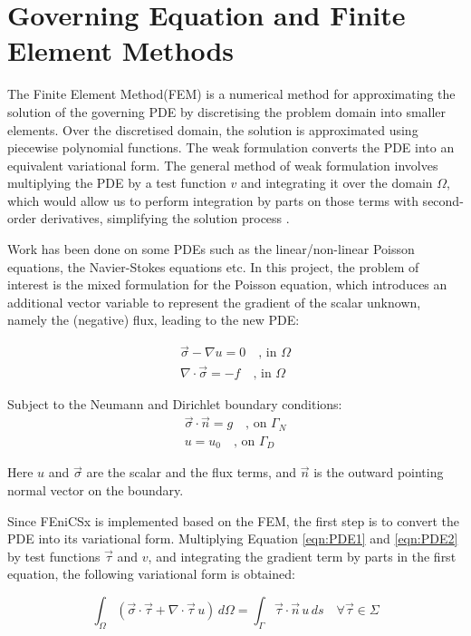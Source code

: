 \section{Governing Equation and Finite Element Methods}
The Finite Element Method(FEM) is a numerical method for approximating the solution of the governing PDE by discretising the problem domain into smaller elements. Over the discretised domain, the solution is approximated using piecewise polynomial functions. The weak formulation converts the PDE into an equivalent variational form. The general method of weak formulation involves multiplying the PDE by a test function $v$ and integrating it over the domain $\Omega$, which would allow us to perform integration by parts on those terms with second-order derivatives, simplifying the solution process \cite{dolfinxtutorial2023}. 

Work has been done on some PDEs such as the linear/non-linear Poisson equations, the Navier-Stokes equations etc. In this project, the problem of interest is the mixed formulation for the Poisson equation, which introduces an additional vector variable to represent the gradient of the scalar unknown, namely the (negative) flux, leading to the new PDE:

\begin{align}
    \Vec{\sigma} - \nabla u = 0 \quad \text{, in }\Omega    \label{eqn:PDE1}\\  
    \nabla \cdot \Vec{\sigma} = -f \quad \text{, in }\Omega     \label{eqn:PDE2}
\end{align}

Subject to the Neumann  and Dirichlet boundary conditions:
\begin{align}
     \Vec{\sigma}  \cdot \Vec{n} =  g \quad \text{, on }\Gamma_{N} \label{eqn:boundary1} \\
     u = u_0 \quad \text{, on }\Gamma_{D}   \label{eqn:boundary2}
\end{align}

Here $u$ and $\Vec{\sigma}$ are the scalar and the flux terms, and $\Vec{n}$ is the outward pointing normal vector on the boundary.

Since FEniCSx is implemented based on the FEM, the first step is to convert the PDE into its variational form. Multiplying Equation \ref{eqn:PDE1} and \ref{eqn:PDE2} by test functions $\vec{\tau}$ and $v$, and integrating the gradient term by parts in the first equation, the following variational form is obtained:

\begin{equation}
\int_{\Omega} (\vec{\sigma} \cdot \vec{\tau} + \nabla \cdot \vec{\tau} \, u) \, d\Omega = \int_{\Gamma} \vec{\tau} \cdot \vec{n} \, u \, ds \quad \forall \vec{\tau} \in \Sigma
\end{equation}

